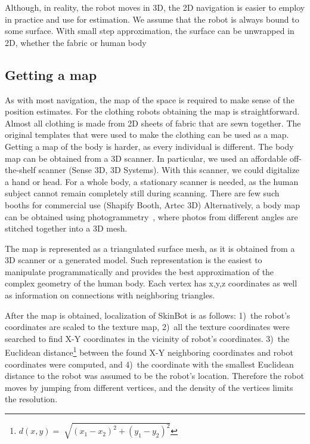 Although, in reality, the robot moves in 3D, the 2D navigation is easier to employ in practice and use for estimation. We assume that the robot is always bound to some surface. With small step approximation, the surface can be unwrapped in 2D, whether the fabric or human body  

\subsection{Getting a map}
As with most navigation, the map of the space is required to make sense of the position estimates. For the clothing robots obtaining the map is straightforward. Almost all clothing is made from 2D sheets of fabric that are sewn together. The original templates that were used to make the clothing can be used as a map. 
Getting a map of the body is harder, as every individual is different. The body map can be obtained from a 3D scanner. In particular, we used an affordable off-the-shelf scanner (Sense 3D, 3D Systems). With this scanner, we could digitalize a hand or head. For a whole body, a stationary scanner is needed, as the human subject cannot remain completely still during scanning. There are few such booths for commercial use (Shapify Booth, Artec 3D)   Alternatively, a body map can be obtained using photogrammetry~\cite{mikhail2001introduction}, where photos from different angles are stitched together into a 3D mesh. 

The map is represented as a triangulated surface mesh, as it is obtained from a 3D scanner or a generated model. Such representation is the easiest to manipulate programmatically and provides the best approximation of the complex geometry of the human body. Each vertex has x,y,z coordinates as well as information on connections with neighboring triangles. 

After the map is obtained, localization of SkinBot is as follows: 1)~the robot's coordinates are scaled to the texture map, 2)~all the texture coordinates were searched to find X-Y coordinates in the vicinity of robot's coordinates. 3)~the Euclidean distance\footnote{$d(x,y)=\sqrt[]{(x_1-x_2)^2+(y_1-y_2)^2}$} between the found X-Y neighboring coordinates and robot coordinates were computed, and 4)~the coordinate with the smallest Euclidean distance to the robot was assumed to be the robot's location. Therefore the robot moves by jumping from different vertices, and the density of the vertices limits the resolution. 

